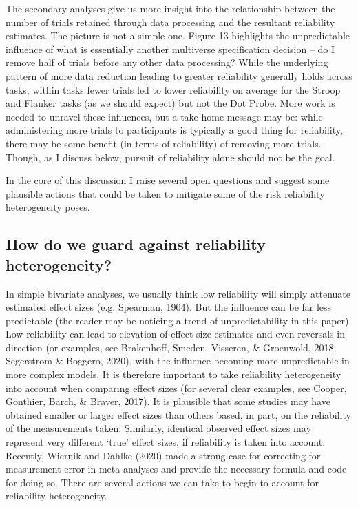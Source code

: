 \documentclass[
  man,floatsintext]{apa6}
\begin{document}
The secondary analyses give us more insight into the relationship between the number of trials retained through data processing and the resultant reliability estimates. The picture is not a simple one. Figure 13 highlights the unpredictable influence of what is essentially another multiverse specification decision -- do I remove half of trials before any other data processing? While the underlying pattern of more data reduction leading to greater reliability generally holds across tasks, within tasks fewer trials led to lower reliability on average for the Stroop and Flanker tasks (as we should expect) but not the Dot Probe. More work is needed to unravel these influences, but a take-home message may be: while administering more trials to participants is typically a good thing for reliability, there may be some benefit (in terms of reliability) of removing more trials. Though, as I discuss below, pursuit of reliability alone should not be the goal.

In the core of this discussion I raise several open questions and suggest some plausible actions that could be taken to mitigate some of the risk reliability heterogeneity poses.

\hypertarget{how-do-we-guard-against-reliability-heterogeneity}{%
\subsection{How do we guard against reliability heterogeneity?}\label{how-do-we-guard-against-reliability-heterogeneity}}

In simple bivariate analyses, we usually think low reliability will simply attenuate estimated effect sizes (e.g. Spearman, 1904). But the influence can be far less predictable (the reader may be noticing a trend of unpredictability in this paper). Low reliability can lead to elevation of effect size estimates and even reversals in direction (or examples, see Brakenhoff, Smeden, Visseren, \& Groenwold, 2018; Segerstrom \& Boggero, 2020), with the influence becoming more unpredictable in more complex models. It is therefore important to take reliability heterogeneity into account when comparing effect sizes (for several clear examples, see Cooper, Gonthier, Barch, \& Braver, 2017). It is plausible that some studies may have obtained smaller or larger effect sizes than others based, in part, on the reliability of the measurements taken. Similarly, identical observed effect sizes may represent very different `true' effect sizes, if reliability is taken into account. Recently, Wiernik and Dahlke (2020) made a strong case for correcting for measurement error in meta-analyses and provide the necessary formula and code for doing so. There are several actions we can take to begin to account for reliability heterogeneity.
\end{document}
